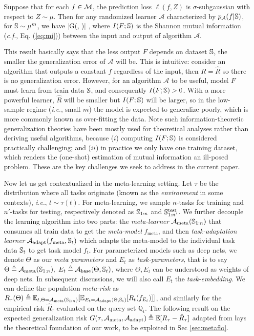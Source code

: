 \documentclass[nohyperref]{article}
\theoremstyle{plain}
\theoremstyle{definition}
\theoremstyle{remark}
\newcommand{\BQ}{\mathbb{Q}}
\newcommand{\CA}{\mathcal{A}}
\newcommand{\te}{{}^{\text{test}}}
\newcommand{\meta}{\text{meta}}
\newcommand{\base}{\text{base}}
\newcommand{\adapt}{\text{adapt}}
\begin{document}
\begin{thm}
Suppose that for each $f\in \mathcal{M}$, the prediction loss $\ell(f,Z)$ is $\sigma$-subgaussian with respect to $Z\sim \mu$. Then for any randomized learner $\CA$ characterized by $p_{\CA}(f|\BS)$, for $\mathbb{S}\sim\mu^m$, we have 
\beq
|G(\mu, \CA)| \leq {}, 
\eeq
where $I(F;\mathbb{S})$ is the Shannon mutual information ({\it c.f.}, Eq. (\ref{eq:mi})) between the input and output of algorithm $\CA$. 
\end{thm}
This result basically says that the less output $F$ depends on dataset $\mathbb{S}$, the smaller the generalization error of $\CA$ will be. This is intuitive: consider an algorithm that outputs a constant $f$ regardless of the input, then $R=\hat{R}$ so there is no generalization error. However, for an algorithm $\CA$ to be useful, model $F$ must learn from train data $\mathbb{S}$, and consequently $I(F;\mathbb{S})>0$. With a more powerful learner, $\hat{R}$ will be smaller but $I(F;\mathbb{S})$ will be larger, so in the low-sample regime ({\it i.e.}, small $m$) the model is expected to generalize poorly, which is more commonly known as over-fitting the data. Note such information-theoretic generalization theories have been mostly used for theoretical analyses rather than deriving useful algorithms, because ($i$) computing $I(F;\mathbb{S})$ is considered practically challenging; and ($ii$) in practice we only have one training dataset, which renders the (one-shot) estimation of mutual information an ill-posed problem. These are the key challenges we seek to address in the current paper.


Now let us get contextualized in the meta-learning setting. Let $\tau$ be the distribution where all tasks originate (known as the {\it environment} in some contexts), {\it i.e.}, $t \sim \tau(t)$. For meta-learning, we sample $n$-tasks for training and $n'$-tasks for testing, respectively denoted as $\mathbb{S}_{1:n}$ and $\BS\te_{1:n'}$. We further decouple the learning algorithm into two parts: the {\it meta-learner} $\CA_{\meta}(\BS_{1:n})$ that consumes all train data to get the {\it meta-model} $f_{\meta}$, and then {\it task-adaptation learner} $\CA_{\adapt}(f_{\meta}, \BS_t)$ which adapts the meta-model to the individual task data $\mathbb{S}_t$ to get task model $f_t$. For parameterized models such as deep nets, we denote $\Theta$ as our {\it meta parameters} and $E_t$ as {\it task-parameters}, that is to say $\Theta \triangleq \CA_{\meta}(\BS_{1:n})$, $E_t \triangleq \CA_{\base}(\Theta, \BS_t)$, where $\Theta, E_t$ can be understood as weights of deep nets. In subsequent discussions, we will also call $E_t$ the {\it task-embedding}. We can define the population {\it meta-risk} as $R_{\tau}(\Theta) \triangleq \EE_{t, \Theta=\CA_{\meta}(\BS_{1:n})}[\EE_{E_t=\CA_{\adapt}(\Theta,\BS_t)}[R_{t}(f_{E_t})]]$, and similarly for the empirical risk $\hat{R}_{\tau}$ evaluated on the query set $\BQ_t$. The following result on the expected generalization risk $G(\tau, \CA_{\meta}, \CA_{\adapt}) \triangleq \EE[R_\tau-\hat{R}_{\tau}]$ adapted from \citet{chen2021generalization} lays the theoretical foundation of our work, to be exploited in Sec \ref{sec:metaflo}. 
\end{document}
